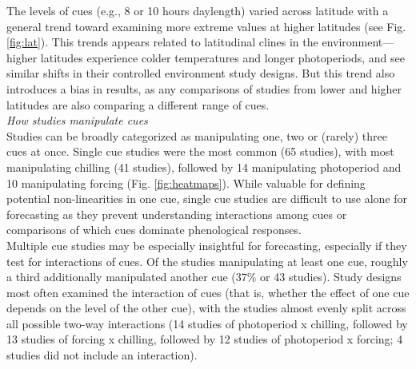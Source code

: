 \documentclass[11pt,letter]{article}
\begin{document}
The levels of cues (e.g., 8 or 10 hours daylength) varied across latitude with a general trend toward examining more extreme values at higher latitudes (see Fig. \ref{fig:lat}). This trends appears related to latitudinal clines in the environment---higher latitudes experience colder temperatures and longer photoperiods, and see similar shifts in their controlled environment study designs. But this trend also introduces a bias in results, as any comparisons of studies from lower and higher latitudes are also comparing a different range of cues. \\



\emph{How studies manipulate cues}\\
Studies can be broadly categorized as manipulating one, two or (rarely) three cues at once. Single cue studies were the most common (65 studies),  with most manipulating chilling  (41 studies), followed by 14 manipulating photoperiod and 10 manipulating forcing (Fig. \ref{fig:heatmaps}). While valuable for defining potential non-linearities in one cue, single cue studies are difficult to use alone for forecasting as they prevent understanding interactions among cues or comparisons of which cues dominate phenological responses. \\

Multiple cue studies may be especially insightful for forecasting, especially if they test for interactions of cues. Of the studies manipulating at least one cue, roughly a third additionally manipulated another cue (37\% or 43 studies). Study designs most often examined the interaction of cues (that is, whether the effect of one cue depends on the level of the other cue), with the studies almost evenly split across all possible two-way interactions (14 studies of photoperiod x chilling, followed by 13 studies of forcing x chilling, followed by 12 studies of photoperiod x forcing; 4 studies did not include an interaction). \\
\end{document}
